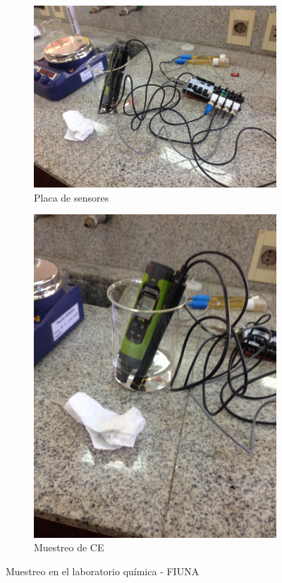 \begin{figure}
\begin{subfigure}[b]{0.4\textwidth}
         \includegraphics[width=\textwidth]{Imagenes/cap4/qca2.jpg}
         \caption{Placa de sensores}
         \label{fig:placas_muestreo}
     \end{subfigure}
     \hfill
     \begin{subfigure}[b]{0.25\textwidth}
         \centering
         \includegraphics[angle=270,width=\textwidth]{Imagenes/cap4/qca3.jpg}
         \caption{Muestreo de CE}
         \label{fig: Muestreo de CE}
     \end{subfigure}
        \caption{Muestreo en el laboratorio qu\'imica - FIUNA}
        \label{fig:muestreoQCA}
\end{figure}


